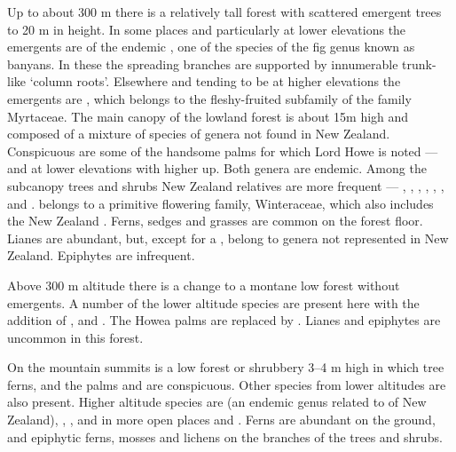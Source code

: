 Up to about 300 m there is a relatively tall forest with scattered emergent trees to 20 m in height.
In some places and particularly at lower elevations the emergents are of the endemic , one of the species of the fig genus known as banyans.
In these the spreading branches are supported by innumerable trunk-like `column roots'.
Elsewhere and tending to be at higher elevations the emergents are , which belongs to the fleshy-fruited subfamily of the family Myrtaceae.
The main canopy of the lowland forest is about 15m high and composed of a mixture of species of genera not found in New Zealand.
Conspicuous are some of the handsome palms for which Lord Howe is noted —  and  at lower elevations with  higher up.
Both genera are endemic.
Among the subcanopy trees and shrubs New Zealand relatives are more frequent — , , , , , ,  and .  belongs to a primitive flowering family, Winteraceae, which also includes the New Zealand .
Ferns, sedges and grasses are common on the forest floor.
Lianes are abundant, but, except for a , belong to genera not represented in New Zealand.
Epiphytes are infrequent.

Above 300 m altitude there is a change to a montane low forest without emergents.
A number of the lower altitude species are present here with the addition of ,  and .
The Howea palms are replaced by .
Lianes and epiphytes are uncommon in this forest.

On the mountain summits is a low forest or shrubbery 3–4 m high in which tree ferns,  and the palms  and  are conspicuous.
Other species from lower altitudes are also present.
Higher altitude species are  (an endemic genus related to  of New Zealand), , , and in more open places  and .
Ferns are abundant on the ground, and epiphytic ferns, mosses and lichens on the branches of the trees and shrubs.

